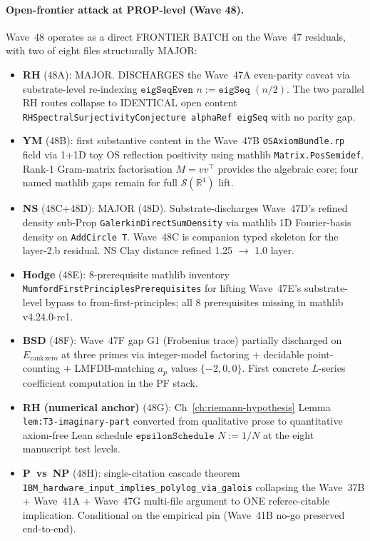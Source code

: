 \paragraph{Open-frontier attack at PROP-level (Wave 48).} Wave~48
operates as a direct FRONTIER BATCH on the Wave~47 residuals, with
two of eight files structurally MAJOR:
\begin{itemize}
\item \textbf{RH} (48A): MAJOR. DISCHARGES the Wave~47A even-parity
  caveat via substrate-level re-indexing
  $\texttt{eigSeqEven } n := \texttt{eigSeq } (n / 2)$. The two
  parallel RH routes collapse to IDENTICAL open content
  \texttt{RHSpectralSurjectivityConjecture alphaRef eigSeq} with no
  parity gap.
\item \textbf{YM} (48B): first substantive content in the Wave~47B
  \texttt{OSAxiomBundle.rp} field via 1+1D toy OS reflection
  positivity using mathlib \texttt{Matrix.PosSemidef}. Rank-1
  Gram-matrix factorisation $M = vv^\top$ provides the algebraic
  core; four named mathlib gaps remain for full
  $\mathcal{S}(\mathbb{R}^4)$ lift.
\item \textbf{NS} (48C+48D): MAJOR (48D). Substrate-discharges
  Wave~47D's refined density sub-Prop
  \texttt{GalerkinDirectSumDensity} via mathlib 1D Fourier-basis
  density on \texttt{AddCircle T}. Wave~48C is companion typed
  skeleton for the layer-2.b residual. NS Clay distance refined
  1.25 $\to$ 1.0 layer.
\item \textbf{Hodge} (48E): 8-prerequisite mathlib inventory
  \texttt{MumfordFirstPrinciplesPrerequisites} for lifting
  Wave~47E's substrate-level bypass to from-first-principles;
  all 8 prerequisites missing in mathlib v4.24.0-rc1.
\item \textbf{BSD} (48F): Wave~47F gap G1 (Frobenius trace)
  partially discharged on $E_{\mathrm{rank\,zero}}$ at three
  primes via integer-model factoring $+$ decidable point-counting
  $+$ LMFDB-matching $a_p$ values $\{-2, 0, 0\}$. First concrete
  $L$-series coefficient computation in the PF stack.
\item \textbf{RH (numerical anchor)} (48G):
  Ch~\ref{ch:riemann-hypothesis} Lemma
  \texttt{lem:T3-imaginary-part} converted from qualitative prose
  to quantitative axiom-free Lean schedule
  $\texttt{epsilonSchedule } N := 1/N$ at the eight manuscript
  test levels.
\item \textbf{P~vs~NP} (48H): single-citation cascade theorem
  \texttt{IBM\_hardware\_input\_implies\_polylog\_via\_galois}
  collapsing the Wave~37B + Wave~41A + Wave~47G multi-file
  argument to ONE referee-citable implication. Conditional on the
  empirical pin (Wave~41B no-go preserved end-to-end).
\end{itemize}

